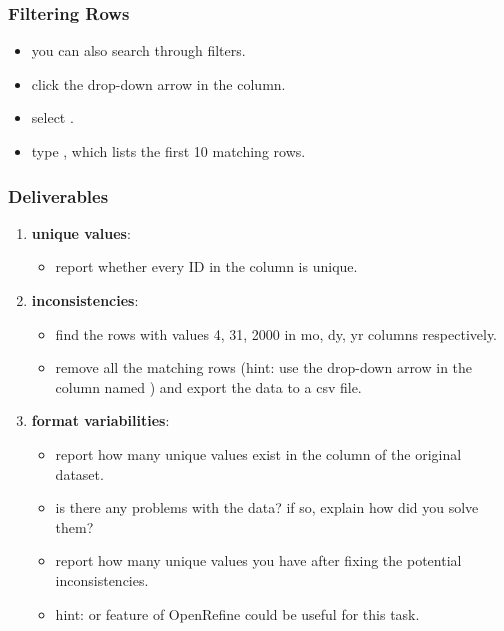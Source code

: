 \documentclass{beamer}					%
\begin{document}
\begin{frame}[c]
\frametitle{Filtering Rows}
\begin{itemize}
\item you can also search through filters.
\item click the drop-down arrow in the  column.
\item select \say{\textcolor{red}{Text Filter}}.
\item type , which lists the first 10 matching rows.
\end{itemize}
\end{frame}

 \begin{frame}[c]
 \frametitle{Deliverables}
 \begin{enumerate}
 \item \textbf{unique values}: 
\begin{itemize}
\item report whether every ID in the column  is unique.
\end{itemize}
 \item \textbf{inconsistencies}: 
 \begin{itemize}
\item find the rows with values 4, 31, 2000 in mo, dy, yr columns respectively.
\item remove all the matching rows (hint: use the drop-down arrow in the column named ) and export the data to a csv file. 
\end{itemize}
\item \textbf{format variabilities}:
\begin{itemize}
\item report how many unique values exist in the  column of the original dataset.
\item is there any problems with the data? if so, explain how did you solve them? 
\item report how many unique values you have after fixing the potential inconsistencies.
\item hint:  or  feature of OpenRefine could be useful for this task.
 \end{itemize}
\setcounter{enumTemp}{\theenumi}
 \end{enumerate}
\end{frame}
\end{document}
